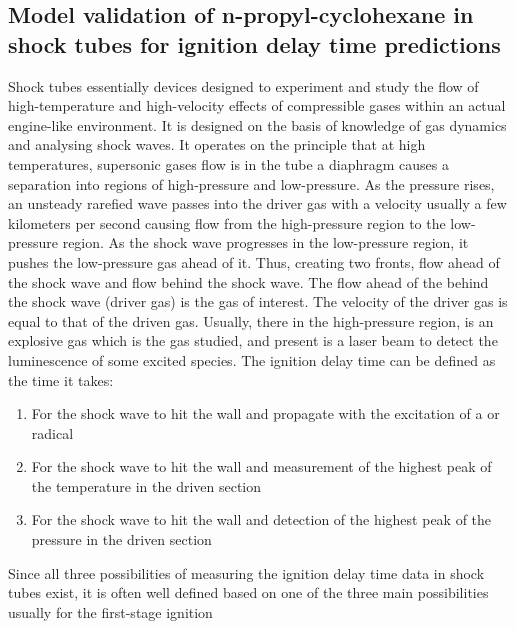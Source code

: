 \subsection{Model validation of n-propyl-cyclohexane in shock tubes for ignition delay time predictions}
Shock tubes essentially devices designed to experiment and study the flow of high-temperature and high-velocity effects of compressible gases within an actual engine-like environment. It is designed on the basis of knowledge of gas dynamics and analysing shock waves. It operates on the principle that at high temperatures, supersonic gases flow is in the tube a diaphragm causes a separation into regions of high-pressure and low-pressure. As the pressure rises, an unsteady rarefied wave passes into the driver gas with a velocity usually a few kilometers per second causing flow from the high-pressure region to the low-pressure region. As the shock wave progresses in the low-pressure region, it pushes the low-pressure gas ahead of it. Thus, creating two fronts, flow ahead of the shock wave and flow behind the shock wave. The flow ahead of the behind the shock wave (driver gas) is the gas of interest. The velocity of the driver gas is equal to  that of the driven gas\cite{Greene1964TheR.}. Usually, there in the high-pressure region, is an explosive gas which is the gas studied, and present is a laser beam to detect the luminescence of some excited species. The ignition delay time can be defined as the time it takes:
\begin{enumerate}
    \item For the shock wave to hit the wall and propagate with the excitation of a  or radical
    \item For the shock wave to hit the wall and measurement of the highest peak of the temperature in the driven section
    \item For the shock wave to hit the wall and detection of the highest peak of the pressure in the driven section
\end{enumerate}
Since all three possibilities of measuring the ignition delay time data in shock tubes exist, it is often well defined based on one of the three main possibilities usually for the first-stage ignition \cite{Davidson2004InterpretingData}\cite{Fieweger1994Shock-tubePressures}\cite{Fieweger1997Self-ignitionPressure}\cite{Pfahl1996Self-ignitionConditions}\cite{Haylett2012IgnitionTube}

